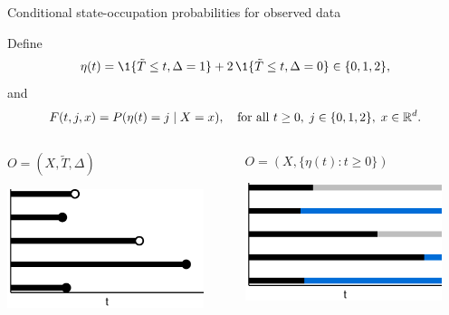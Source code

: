 \documentclass[smaller]{beamer}\usepackage{listings}
\begin{document}
\begin{frame}[label={sec:org83a22d1}]{Conditional state-occupation probabilities for observed data}
\small

Define
\begin{equation*}
  \eta(t) = \1{\{\tilde{T} \leq t, \Delta = 1\}} + 2 \, \1{\{\tilde{T} \leq t,
    \Delta = 0\}}
  \in \{0, 1, 2\},
\end{equation*}
and
\begin{equation*}
  F(t, j, x) = P(\eta(t) = j \mid X=x), \quad \text{for all } t \geq 0,\; j
  \in \{0, 1, 2\}, \; x \in \mathbb{R}^d.
\end{equation*}

\vfill

\begin{columns}
\begin{column}{0.45\columnwidth}
\centering \color{bblue}\(O = (X, \tilde T , \Delta)\)\color{black} 

\begin{center}
\includegraphics[width=0.9\textwidth]{./multi-state-data-1.pdf}
\end{center}
\end{column}

\begin{column}{0.45\columnwidth}
\centering \color{bblue}\(O = (X, \{\eta(t) : t \geq 0\})\)\color{black}

\begin{center}
\includegraphics[width=0.9\textwidth]{./multi-state-data-3.pdf}
\end{center}
\end{column}
\end{columns}
\end{frame}
\end{document}
